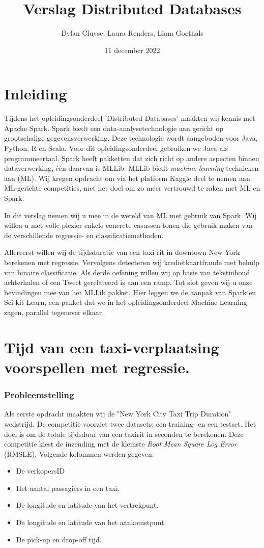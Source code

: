 \documentclass[a4paper,10pt,twoside]{report}
\title{Verslag Distributed Databases}
\author{Dylan {Cluyse}, Laura {Renders}, Liam {Goethals}}
\date{11 december 2022}
\begin{document}
\maketitle

\tableofcontents

\chapter{Inleiding}

Tijdens het opleidingsonderdeel 'Distributed Databases' maakten wij kennis met Apache Spark. Spark biedt een data-analysetechnologie aan gericht op grootschalige gegevensverwerking. Deze technologie wordt aangeboden voor Java, Python, R en Scala. Voor dit opleidingsonderdeel gebruiken we Java als programmeertaal. Spark heeft pakketten dat zich richt op andere aspecten binnen dataverwerking, één daarvan is MLLib. MLLib biedt \textit{machine learning} technieken aan (ML). Wij kregen opdracht om via het platform Kaggle deel te nemen aan ML-gerichte competities, met het doel om zo meer vertrouwd te raken met ML en Spark.

In dit verslag nemen wij u mee in de wereld van ML met gebruik van Spark. Wij willen u met volle plezier enkele concrete casussen tonen die gebruik maken van de verschillende regressie- en classificatiemethoden.

Allereerst willen wij de tijdsduratie van een taxi-rit in downtown New York berekenen met regressie. Vervolgens detecteren wij kredietkaartfraude met behulp van binaire classificatie. Als derde oefening willen wij op basis van tekstinhoud achterhalen of een Tweet gerelateerd is aan een ramp. Tot slot geven wij u onze bevindingen mee van het MLLib pakket. Hier leggen we de aanpak van Spark en Sci-kit Learn, een pakket dat we in het opleidingsonderdeel Machine Learning zagen, parallel tegenover elkaar.

\chapter{Tijd van een taxi-verplaatsing voorspellen met regressie.}

\subsection*{Probleemstelling}

Als eerste opdracht maakten wij de "New York City Taxi Trip Duration" wedstrijd. De competitie voorziet twee datasets: een training- en een testset. Het doel is om de totale tijdsduur van een taxirit in seconden te berekenen. Deze competitie kiest de inzending met de kleinste \textit{Root Mean Square Log Error} (RMSLE). Volgende kolommen werden gegeven: 
\begin{itemize}
	\item De verkopersID
	\item Het aantal passagiers in een taxi.
	\item De longitude en latitude van het vertrekpunt.
	\item De longitude en latitude van het aankomstpunt.
	\item De pick-up en drop-off tijd.
\end{itemize}
\end{document}
